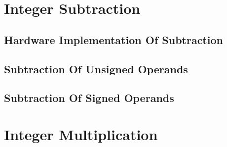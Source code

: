 \section {Integer Subtraction}


\subsection{Hardware Implementation Of Subtraction}


\subsection{Subtraction Of Unsigned Operands}


\subsection{Subtraction Of Signed Operands}



\section{Integer Multiplication}


